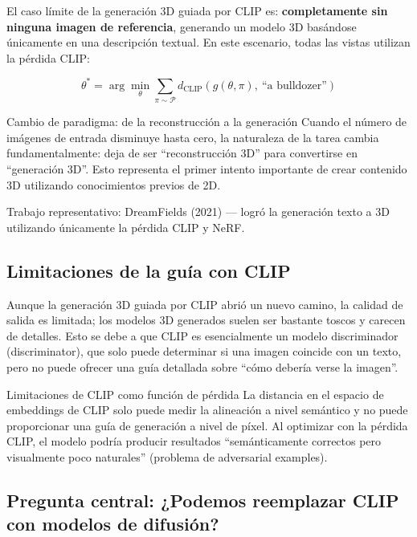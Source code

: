 El caso límite de la generación 3D guiada por CLIP es: \textbf{completamente sin ninguna imagen de referencia}, generando un modelo 3D basándose únicamente en una descripción textual. En este escenario, todas las vistas utilizan la pérdida CLIP:

$$
\theta^* = \arg\min_{\theta} \sum_{\pi \sim \mathcal{P}} d_{\text{CLIP}}(g(\theta, \pi),\ \text{``a bulldozer''})
$$

\begin{importantbox}{Cambio de paradigma: de la reconstrucción a la generación}
Cuando el número de imágenes de entrada disminuye hasta cero, la naturaleza de la tarea cambia fundamentalmente: deja de ser ``reconstrucción 3D'' para convertirse en ``generación 3D''. Esto representa el primer intento importante de crear contenido 3D utilizando conocimientos previos de 2D.

Trabajo representativo: DreamFields (2021) — logró la generación texto a 3D utilizando únicamente la pérdida CLIP y NeRF.
\end{importantbox}

\subsection{Limitaciones de la guía con CLIP}

Aunque la generación 3D guiada por CLIP abrió un nuevo camino, la calidad de salida es limitada; los modelos 3D generados suelen ser bastante toscos y carecen de detalles. Esto se debe a que CLIP es esencialmente un modelo discriminador (discriminator), que solo puede determinar si una imagen coincide con un texto, pero no puede ofrecer una guía detallada sobre ``cómo debería verse la imagen''.

\begin{warningbox}{Limitaciones de CLIP como función de pérdida}
La distancia en el espacio de embeddings de CLIP solo puede medir la alineación a nivel semántico y no puede proporcionar una guía de generación a nivel de píxel. Al optimizar con la pérdida CLIP, el modelo podría producir resultados ``semánticamente correctos pero visualmente poco naturales'' (problema de adversarial examples).
\end{warningbox}

\subsection{Pregunta central: ¿Podemos reemplazar CLIP con modelos de difusión?}

